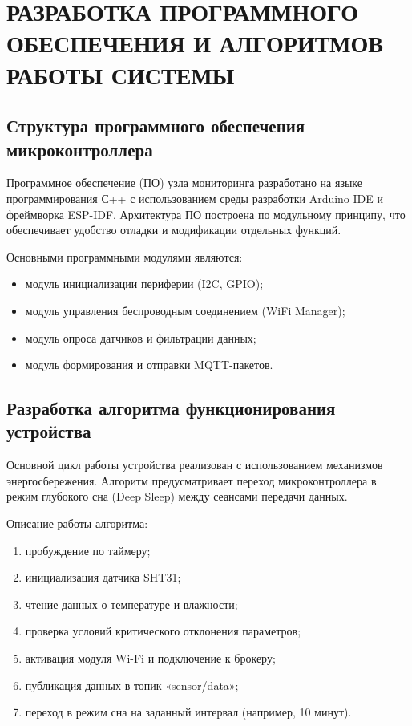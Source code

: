 \chapter{РАЗРАБОТКА ПРОГРАММНОГО ОБЕСПЕЧЕНИЯ И АЛГОРИТМОВ РАБОТЫ СИСТЕМЫ}

\section{Структура программного обеспечения микроконтроллера}

Программное обеспечение (ПО) узла мониторинга разработано на языке программирования С++ с использованием среды разработки Arduino IDE и фреймворка ESP-IDF. Архитектура ПО построена по модульному принципу, что обеспечивает удобство отладки и модификации отдельных функций.

Основными программными модулями являются:
\begin{itemize}
    \item модуль инициализации периферии (I2C, GPIO);
    \item модуль управления беспроводным соединением (WiFi Manager);
    \item модуль опроса датчиков и фильтрации данных;
    \item модуль формирования и отправки MQTT-пакетов.
\end{itemize}

\section{Разработка алгоритма функционирования устройства}

Основной цикл работы устройства реализован с использованием механизмов энергосбережения. Алгоритм предусматривает переход микроконтроллера в режим глубокого сна (Deep Sleep) между сеансами передачи данных.



Описание работы алгоритма:
\begin{enumerate}
    \item пробуждение по таймеру;
    \item инициализация датчика SHT31;
    \item чтение данных о температуре и влажности;
    \item проверка условий критического отклонения параметров;
    \item активация модуля Wi-Fi и подключение к брокеру;
    \item публикация данных в топик «sensor/data»;
    \item переход в режим сна на заданный интервал (например, 10 минут).
\end{enumerate}

